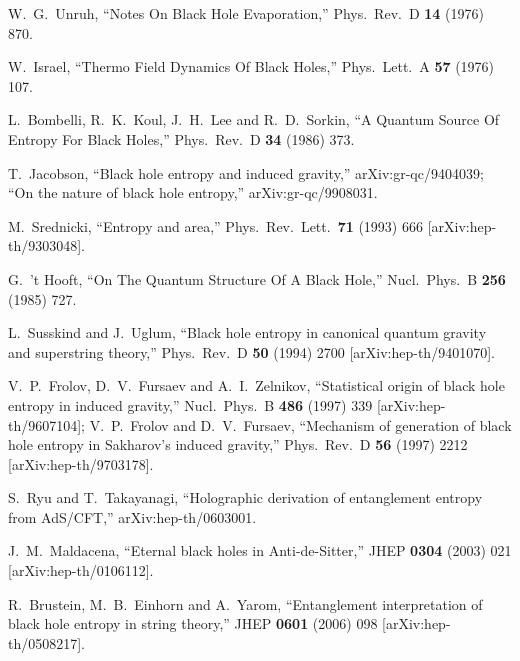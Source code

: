 \documentclass[12pt]{article}
\begin{document}
\begin{thebibliography}{99}

W.~G.~Unruh,
  ``Notes On Black Hole Evaporation,''
  Phys.\ Rev.\ D {\bf 14} (1976) 870.

W.~Israel,
  ``Thermo Field Dynamics Of Black Holes,''
  Phys.\ Lett.\ A {\bf 57} (1976) 107.

L.~Bombelli, R.~K.~Koul, J.~H.~Lee and R.~D.~Sorkin,
  ``A Quantum Source Of Entropy For Black Holes,''
  Phys.\ Rev.\ D {\bf 34} (1986) 373.

T.~Jacobson,
  ``Black hole entropy and induced gravity,''
  arXiv:gr-qc/9404039;
``On the nature of black hole entropy,''
  arXiv:gr-qc/9908031.

M.~Srednicki,
  ``Entropy and area,''
  Phys.\ Rev.\ Lett.\  {\bf 71} (1993) 666
  [arXiv:hep-th/9303048].

G.~'t Hooft,
  ``On The Quantum Structure Of A Black Hole,''
  Nucl.\ Phys.\ B {\bf 256} (1985) 727.

L.~Susskind and J.~Uglum,
  ``Black hole entropy in canonical quantum gravity and superstring theory,''
  Phys.\ Rev.\ D {\bf 50} (1994) 2700
  [arXiv:hep-th/9401070].

V.~P.~Frolov, D.~V.~Fursaev and A.~I.~Zelnikov,
  ``Statistical origin of black hole entropy in induced gravity,''
  Nucl.\ Phys.\ B {\bf 486} (1997) 339
  [arXiv:hep-th/9607104];
  V.~P.~Frolov and D.~V.~Fursaev,
``Mechanism of generation of black hole entropy in Sakharov's induced
  gravity,''
  Phys.\ Rev.\ D {\bf 56} (1997) 2212
  [arXiv:hep-th/9703178].

S.~Ryu and T.~Takayanagi,
  ``Holographic derivation of entanglement entropy from AdS/CFT,''
  arXiv:hep-th/0603001.

J.~M.~Maldacena,
  ``Eternal black holes in Anti-de-Sitter,''
  JHEP {\bf 0304} (2003) 021
  [arXiv:hep-th/0106112].

R.~Brustein, M.~B.~Einhorn and A.~Yarom,
  ``Entanglement interpretation of black hole entropy in string theory,''
  JHEP {\bf 0601} (2006) 098
  [arXiv:hep-th/0508217].


\end{thebibliography}
\end{document}
